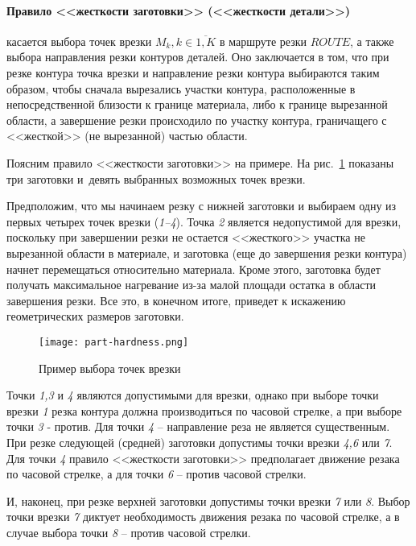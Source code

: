 \paragraph*{Правило <<жесткости заготовки>> (<<жесткости детали>>)}

касается выбора точек врезки
$M_k, k \in \overline{1,K}$
в маршруте резки  $ROUTE$,
а также выбора направления резки контуров деталей.
Оно заключается в том, что при резке контура точка
врезки и направление резки контура выбираются таким образом,
чтобы сначала вырезались участки контура,
расположенные в непосредственной близости к границе материала,
либо к границе вырезанной области,
а завершение резки происходило по участку контура,
граничащего с <<жесткой>> (не вырезанной) частью области.

Поясним правило <<жесткости заготовки>> на примере.
На рис.~\ref{part-hardness}
показаны три заготовки
и~девять выбранных возможных точек врезки.

Предположим, что мы начинаем резку с нижней заготовки
и выбираем одну из первых четырех точек врезки
(\textit{1--4}).
Точка \textit{2} является недопустимой для врезки,
поскольку при завершении резки не остается
<<жесткого>> участка не вырезанной области в материале,
и заготовка (еще до завершения резки контура)
начнет перемещаться относительно материала.
Кроме этого, заготовка будет получать максимальное
нагревание из-за малой площади остатка в области завершения резки.
Все это, в конечном итоге,
приведет к искажению геометрических размеров заготовки.

\begin{figure}[H]
  \centering
  \texttt{[image: part-hardness.png]}
  \caption{
    Пример выбора точек врезки
  }
  \label{part-hardness}
\end{figure}

Точки
\textit{1,3} и \textit{4}
являются допустимыми для врезки,
однако при выборе точки врезки {\it 1} резка контура
должна производиться по часовой стрелке,
а при выборе точки {\it 3} - против.
Для точки {\it 4} -- направление реза не является существенным.
При резке следующей (средней) заготовки
допустимы точки врезки {\it 4,6} или {\it 7}.
Для точки {\it 4} правило <<жесткости заготовки>>
предполагает движение резака по часовой стрелке,
а для точки {\it 6} – против часовой стрелки.

И, наконец, при резке верхней заготовки
допустимы точки врезки {\it 7} или {\it 8}.
Выбор точки врезки {\it 7} диктует необходимость
движения резака по часовой стрелке,
а в случае выбора точки {\it 8} – против часовой стрелки.

